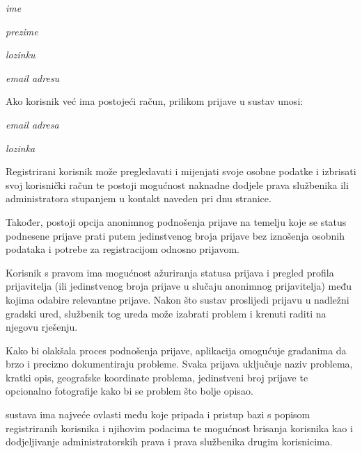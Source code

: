 \begin{packed_item}
	\item \textit{ime}
	\item \textit{prezime}
	\item \textit{lozinku}
	\item \textit{email adresu}
\end{packed_item}

\noindent Ako korisnik već ima postojeći račun, prilikom prijave u sustav unosi:

\begin{packed_item}
	\item \textit{email adresa}
	\item \textit{lozinka}
\end{packed_item}

\noindent Registrirani korisnik može pregledavati i mijenjati svoje osobne podatke i izbrisati svoj korisnički račun te postoji mogućnost naknadne dodjele prava službenika ili administratora stupanjem u kontakt naveden pri dnu stranice.

\noindent Također, postoji opcija anonimnog podnošenja prijave na temelju koje se status podnesene prijave prati putem jedinstvenog broja prijave bez iznošenja osobnih podataka i potrebe za registracijom odnosno prijavom.

Korisnik s pravom  ima mogućnost ažuriranja statusa prijava i pregled profila prijavitelja (ili jedinstvenog broja prijave u slučaju anonimnog prijavitelja) među kojima odabire relevantne prijave. Nakon što sustav proslijedi prijavu u nadležni gradski ured, službenik tog ureda može izabrati problem i krenuti raditi na njegovu rješenju.

\noindent Kako bi olakšala proces podnošenja prijave, aplikacija omogućuje građanima da brzo i precizno dokumentiraju probleme. Svaka prijava uključuje naziv problema, kratki opis, geografske koordinate problema, jedinstveni broj prijave te opcionalno fotografije kako bi se problem što bolje opisao.

 sustava ima najveće ovlasti među koje pripada i pristup bazi s popisom registriranih korisnika i njihovim podacima te mogućnost brisanja korisnika kao i dodjeljivanje administratorskih prava i prava službenika drugim korisnicima.

